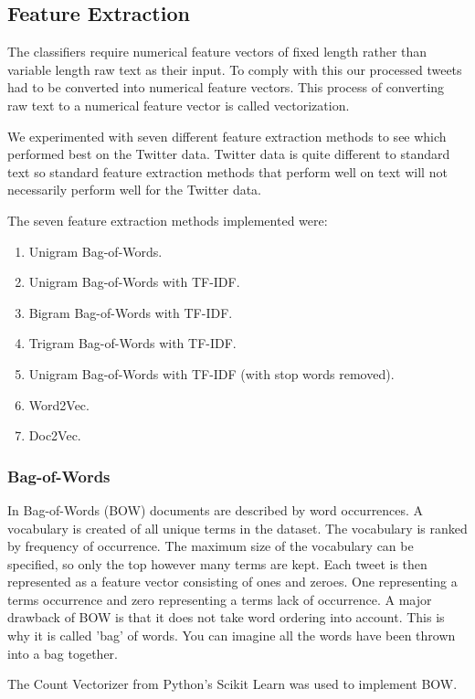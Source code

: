 \subsection*{Feature Extraction}

The classifiers require numerical feature vectors of fixed length rather than variable length raw text as their input. To comply with this our processed tweets had to be converted into numerical feature vectors. This process of converting raw text to a numerical feature vector is called vectorization.

We experimented with seven different feature extraction methods to see which performed best on the Twitter data. Twitter data is quite different to standard text so standard feature extraction methods that perform well on text will not necessarily perform well for the Twitter data.

The seven feature extraction methods implemented were:
\begin{enumerate}
    \item Unigram Bag-of-Words.
    \item Unigram Bag-of-Words with TF-IDF.
    \item Bigram Bag-of-Words with TF-IDF.
    \item Trigram Bag-of-Words with TF-IDF.
    \item Unigram Bag-of-Words with TF-IDF (with stop words removed).
    \item Word2Vec.
    \item Doc2Vec.
\end{enumerate}

\subsubsection{Bag-of-Words}

In Bag-of-Words (BOW) documents are described by word occurrences. A vocabulary is created of all unique terms in the dataset. The vocabulary is ranked by frequency of occurrence. The maximum size of the vocabulary can be specified, so only the top however many terms are kept. Each tweet is then represented as a feature vector consisting of ones and zeroes. One representing a terms occurrence and zero representing a terms lack of occurrence. A major drawback of BOW is that it does not take word ordering into account. This is why it is called 'bag' of words. You can imagine all the words have been thrown into a bag together.

The Count Vectorizer from Python's Scikit Learn was used to implement BOW. 

